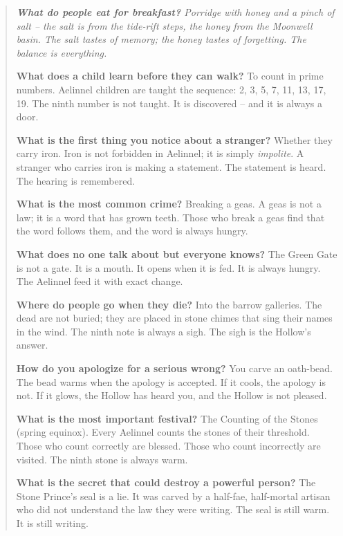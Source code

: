 \documentclass[12pt,oneside]{book}
\newenvironment{almanac}
  {\begin{quote}\small\itshape}
  {\end{quote}}
\begin{document}
\vspace{1em}
\begin{almanac}
\textbf{What do people eat for breakfast?} Porridge with honey and a pinch of salt -- the salt is from the tide-rift steps, the honey from the Moonwell basin. The salt tastes of memory; the honey tastes of forgetting. The balance is everything.

\textbf{What does a child learn before they can walk?} To count in prime numbers. Aelinnel children are taught the sequence: 2, 3, 5, 7, 11, 13, 17, 19. The ninth number is not taught. It is discovered -- and it is always a door.

\textbf{What is the first thing you notice about a stranger?} Whether they carry iron. Iron is not forbidden in Aelinnel; it is simply \textit{impolite}. A stranger who carries iron is making a statement. The statement is heard. The hearing is remembered.

\textbf{What is the most common crime?} Breaking a geas. A geas is not a law; it is a word that has grown teeth. Those who break a geas find that the word follows them, and the word is always hungry.

\textbf{What does no one talk about but everyone knows?} The Green Gate is not a gate. It is a mouth. It opens when it is fed. It is always hungry. The Aelinnel feed it with exact change.

\textbf{Where do people go when they die?} Into the barrow galleries. The dead are not buried; they are placed in stone chimes that sing their names in the wind. The ninth note is always a sigh. The sigh is the Hollow's answer.

\textbf{How do you apologize for a serious wrong?} You carve an oath-bead. The bead warms when the apology is accepted. If it cools, the apology is not. If it glows, the Hollow has heard you, and the Hollow is not pleased.

\textbf{What is the most important festival?} The Counting of the Stones (spring equinox). Every Aelinnel counts the stones of their threshold. Those who count correctly are blessed. Those who count incorrectly are visited. The ninth stone is always warm.

\textbf{What is the secret that could destroy a powerful person?} The Stone Prince's seal is a lie. It was carved by a half-fae, half-mortal artisan who did not understand the law they were writing. The seal is still warm. It is still writing.
\end{almanac}
\end{document}
